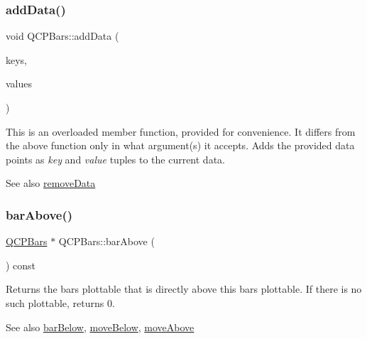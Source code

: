 \subsubsection{\texorpdfstring{add\+Data()}{addData()}\hspace{0.1cm}{\footnotesize\ttfamily [4/4]}}
{\footnotesize\ttfamily void Q\+C\+P\+Bars\+::add\+Data (\begin{DoxyParamCaption}\item[{const Q\+Vector$<$ double $>$ \&}]{keys,  }\item[{const Q\+Vector$<$ double $>$ \&}]{values }\end{DoxyParamCaption})}

This is an overloaded member function, provided for convenience. It differs from the above function only in what argument(s) it accepts. Adds the provided data points as {\itshape key} and {\itshape value} tuples to the current data. \begin{DoxySeeAlso}{See also}
\hyperlink{class_q_c_p_bars_a1fe9bcb57d670defea1bb65cadf43765}{remove\+Data} 
\end{DoxySeeAlso}
\hypertarget{class_q_c_p_bars_ab97f2acd9f6cb40d2cc3c33d278f0e78}{}\label{class_q_c_p_bars_ab97f2acd9f6cb40d2cc3c33d278f0e78} 
\subsubsection{\texorpdfstring{bar\+Above()}{barAbove()}}
{\footnotesize\ttfamily \hyperlink{class_q_c_p_bars}{Q\+C\+P\+Bars} $\ast$ Q\+C\+P\+Bars\+::bar\+Above (\begin{DoxyParamCaption}{ }\end{DoxyParamCaption}) const\hspace{0.3cm}{\ttfamily [inline]}}

Returns the bars plottable that is directly above this bars plottable. If there is no such plottable, returns 0.

\begin{DoxySeeAlso}{See also}
\hyperlink{class_q_c_p_bars_a1b58664864b141f45e02044a855b3213}{bar\+Below}, \hyperlink{class_q_c_p_bars_a69fc371346980f19177c3d1ecdad78ee}{move\+Below}, \hyperlink{class_q_c_p_bars_ac22e00a6a41509538c21b04f0a57318c}{move\+Above} 
\end{DoxySeeAlso}
\hypertarget{class_q_c_p_bars_a1b58664864b141f45e02044a855b3213}{}\label{class_q_c_p_bars_a1b58664864b141f45e02044a855b3213} 
